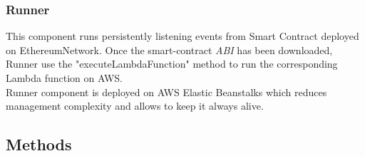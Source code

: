 \subsubsection{Runner}
This component runs persistently listening events from Smart Contract deployed on Ethereum\glo Network. Once the smart-contract \textit{ABI\glo} has been downloaded, Runner use the "executeLambdaFunction" method to run the corresponding Lambda function on AWS.\\ Runner component is deployed on AWS Elastic Beanstalks which reduces management complexity and allows to keep it always alive.


\subsection{Methods}
